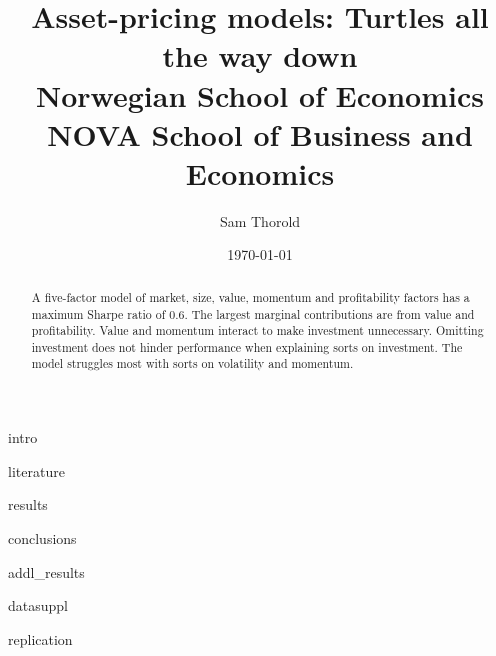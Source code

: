 \documentclass[a4paper, 12pt]{article}
\title{
  {Asset-pricing models: Turtles all the way down}\\
  {\large Norwegian School of Economics}\\
  {\large NOVA School of Business and Economics}
}
\author{Sam Thorold}
\date{\today}
\begin{document}
\maketitle

\begin{abstract}
  A five-factor model of
  market, size, value, momentum and profitability factors
  has a maximum Sharpe ratio of 0.6.
  The largest marginal contributions are from value and profitability.
  Value and momentum interact to make investment unnecessary.
  Omitting investment does not hinder performance when explaining sorts on investment.
  The model struggles most with sorts on volatility and momentum.
\end{abstract}

{intro}

{literature}



{results}

{conclusions}

\printbibliography

\appendix

{addl_results}

{datasuppl}

{replication}
\end{document}

